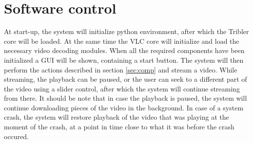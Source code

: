 \section{Software control}
\label{sec:softctrl}
At start-up, the system will initialize python environment, after which the Tribler core will be loaded. At the same time the VLC core will initialize and load the necessary video decoding modules. When all the required components have been initialized a GUI will be shown, containing a start button. The system will then perform the actions described in section \ref{sec:comp} and stream a video. While streaming, the playback can be paused, or the user can seek to a different part of the video using a slider control, after which the system will continue streaming from there. It should be note that in case the playback is paused, the system will continue downloading pieces of the video in the background. In case of a system crash, the system will restore playback of the video that was playing at the moment of the crash, at a point in time close to what it was before the crash occured.
